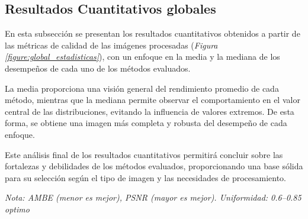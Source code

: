\documentclass[sigchi]{acmart}
\begin{document}
\subsection{Resultados Cuantitativos globales} \label{subsec:resultados_cuantitativos}

En esta subsección se presentan los resultados cuantitativos obtenidos a partir de las métricas
de calidad de las imágenes procesadas (\emph{Figura \ref{figure:global_estadisticas}}), con un enfoque en la media y la mediana de los
desempeños de cada uno de los métodos evaluados.

La media proporciona una visión general del rendimiento promedio de cada método, mientras que
la mediana permite observar el comportamiento en el valor central de las distribuciones,
evitando la influencia de valores extremos. De esta forma, se obtiene una imagen más completa y
robusta del desempeño de cada enfoque.

Este análisis final de los resultados cuantitativos permitirá concluir sobre las fortalezas y
debilidades de los métodos evaluados, proporcionando una base sólida para su selección según el
tipo de imagen y las necesidades de procesamiento.

\begin{table}[H]
	\centering
	\caption{Comparación estadística de los algoritmos de mejora de contraste}
	\label{tab:comparacion}
	\small

	\vspace{0.5em}
	\footnotesize%
	\textit{Nota: AMBE (menor es mejor), PSNR (mayor es mejor). Uniformidad: 0.6–0.85 optimo}
	\label{figure:global_estadisticas}
\end{table}
\end{document}
